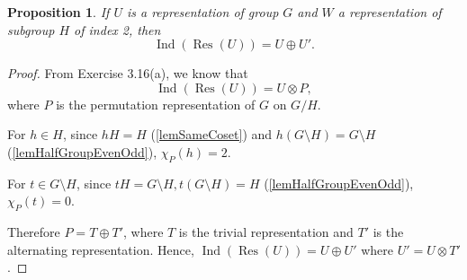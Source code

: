 \documentclass[12pt, letterpaper]{article}
\newcommand{\Res}{\operatorname{Res}}
\newcommand{\Ind}{\operatorname{Ind}}
\newtheorem{prop}{Proposition}[section]
\theoremstyle{definition}
\theoremstyle{remark}
\theoremstyle{definition}
\theoremstyle{plain}
\numberwithin{equation}{section}
\begin{document}
	\begin{prop}\label{lemIndResU=U+U'}
		If $U$ is a representation of group $G$
		and $W$ a representation of subgroup $H$ of index 2, 
		then \[\Ind(\Res(U))=U\oplus U'.\]
	\end{prop}
	\begin{proof}
		From Exercise 3.16(a), we know that 
		\[\Ind(\Res(U)) = U \otimes P,\]
		where $P$ is the permutation representation of $G$ on $G/H$.
		
		For $h\in H$, since $hH=H$ (\autoref{lemSameCoset}) and $h(G\setminus H)=G\setminus H$ (\autoref{lemHalfGroupEvenOdd}),
		$\chi_P(h)=2$.
		
		For $t\in G\setminus H$, since $tH=G\setminus H, t(G\setminus H)=H$ (\autoref{lemHalfGroupEvenOdd}),
		$\chi_P(t)=0$.
		
		Therefore $P=T\oplus T'$, where $T$ is the trivial representation and $T'$ is the alternating representation.
		Hence, $\Ind(\Res(U))=U\oplus U'$ where $U'=U\otimes T'$.
	\end{proof}
\end{document}
